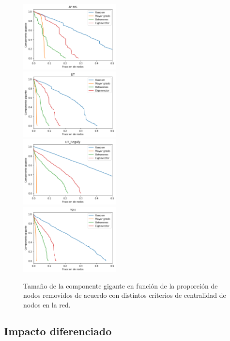 \documentclass[%
 reprint,
 amsmath,amssymb,
 aps,
]{revtex4-1}
\begin{document}
\begin{figure}
\includegraphics[width=0.45\textwidth]{figura2a.png}\\
\includegraphics[width=0.45\textwidth]{figura2b.png}\\
\includegraphics[width=0.45\textwidth]{figura2c.png}\\
\includegraphics[width=0.45\textwidth]{figura2d.png}\\
\label{figura2}
\caption{Tama\~no de la componente gigante en funci\'on de la proporci\'on de nodos removidos de acuerdo con distintos criterios de centralidad de nodos en la red.}
\end{figure}

\subsection{Impacto diferenciado}
\end{document}
